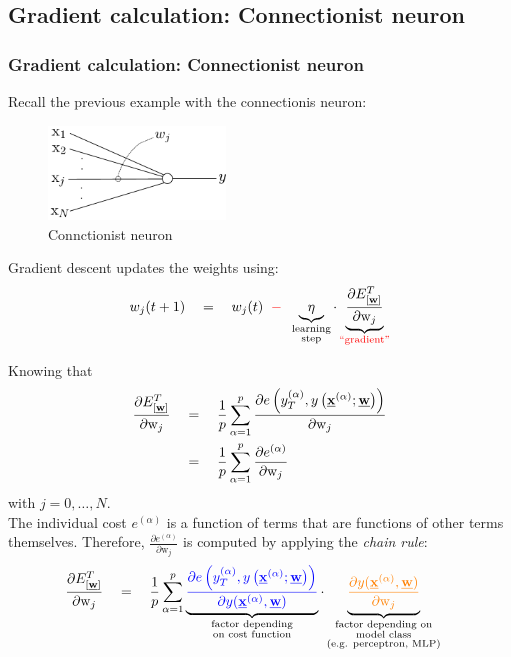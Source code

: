 \subsection{Gradient calculation: Connectionist neuron}

\begin{frame}\frametitle{Gradient calculation: Connectionist neuron}
    
    Recall the previous example with the connectionis neuron:
    
    \begin{figure}[h]
        \centering
        \includegraphics[height=2.5cm]{img/linearNeuron_y}
        \caption{Connctionist neuron}
        \label{fig:neuron} 
    \end{figure}
    
    Gradient descent updates the weights using:
    \begin{equation}
    		w_{j}(t+1) \quad=\quad w_{j}(t) 
				\;\;{\color{red}-}\;\;
				\underbrace{{\eta}}_{ 
						\substack{\text{learning} \\ \text{step} } }
                        \cdot
				\underbrace{\frac{\partial {E}^T_{[\underline{\mathbf{w}}]}}{
					\partial \mathrm{w}_{j}}}_{
						\substack{
							\text{\textcolor{red}{``gradient''}} 
			} }
    \end{equation}
    
    Knowing that
    \begin{align}
		\frac{\partial {E}^T_{[\underline{\mathbf{w}}]}}
			{\partial \mathrm{w}_{j}}
		\quad&=\quad \frac{1}{p} \sum_{\alpha=1}^p
        \frac{\partial e\left(y^{(\alpha)}_T, y\left(\underline{\mathbf{x}}^{(\alpha)}; \underline{\mathbf{w}}\right)\right)}
			{\partial \mathrm{w}_{j}}\\
        &=\quad \frac{1}{p} \sum_{\alpha=1}^p 
        \frac{\partial e^{(\alpha)}}
			{\partial \mathrm{w}_{j}}
	\end{align}
    with $j=0,\ldots,N$.\\
    
    The individual cost $e^{(\alpha)}$ is a function of terms that are functions of other terms themselves. Therefore, $\frac{\partial e^{(\alpha)}}{\partial \mathrm{w}_{j}}$ is computed by applying the \emph{chain rule}:\\
    
	\begin{align}
		\frac{\partial {E}^T_{[\underline{\mathbf{w}}]}}
			{\partial \mathrm{w}_{j}}
		&\quad=\quad \frac{1}{p} \sum_{\alpha=1}^p	\underbrace{
			\textcolor{blue}{
			\frac{\partial e\left(y^{(\alpha)}_T, y\left(\underline{\mathbf{x}}^{(\alpha)}; \underline{\mathbf{w}}\right)\right)}{\partial 
					y(\underline{\mathbf{x}}^{(\alpha)}, \underline{\mathbf{w}})} }}_{
						\substack{\text{factor depending} \\
							\text{on cost function}}}
				  \cdot \underbrace{
			\textcolor{orange}{
			\frac{\partial y(\underline{\mathbf{x}}^{(\alpha)}, \underline{\mathbf{w}})}{
					\partial \mathrm{w}_{j}}} }_{
						\substack{\text{factor depending on} \\
							\text{model class}\\
                            \text{(e.g. perceptron, MLP)}}}
	\end{align}
    

\end{frame}
